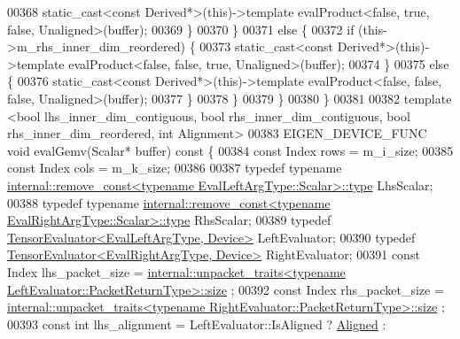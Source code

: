 \begin{DoxyCode}
00368           \textcolor{keyword}{static\_cast<}\textcolor{keyword}{const }Derived*\textcolor{keyword}{>}(\textcolor{keyword}{this})->\textcolor{keyword}{template} evalProduct<false, true, false, Unaligned>(buffer);
00369         \}
00370       \}
00371       \textcolor{keywordflow}{else} \{
00372        \textcolor{keywordflow}{if} (this->m\_rhs\_inner\_dim\_reordered) \{
00373           \textcolor{keyword}{static\_cast<}\textcolor{keyword}{const }Derived*\textcolor{keyword}{>}(\textcolor{keyword}{this})->\textcolor{keyword}{template} evalProduct<false, false, true, Unaligned>(buffer);
00374         \}
00375         \textcolor{keywordflow}{else} \{
00376           \textcolor{keyword}{static\_cast<}\textcolor{keyword}{const }Derived*\textcolor{keyword}{>}(\textcolor{keyword}{this})->\textcolor{keyword}{template} evalProduct<false, false, false, Unaligned>(buffer);
00377         \}
00378       \}
00379     \}
00380   \}
00381 
00382   \textcolor{keyword}{template} <\textcolor{keywordtype}{bool} lhs\_inner\_dim\_contiguous, \textcolor{keywordtype}{bool} rhs\_inner\_dim\_contiguous, \textcolor{keywordtype}{bool} rhs\_inner\_dim\_reordered, \textcolor{keywordtype}{int}
       Alignment>
00383   EIGEN\_DEVICE\_FUNC \textcolor{keywordtype}{void} evalGemv(Scalar* buffer)\textcolor{keyword}{ const }\{
00384     \textcolor{keyword}{const} Index rows = m\_i\_size;
00385     \textcolor{keyword}{const} Index cols = m\_k\_size;
00386 
00387     \textcolor{keyword}{typedef} \textcolor{keyword}{typename} 
      \hyperlink{group___sparse_core___module}{internal::remove\_const<typename EvalLeftArgType::Scalar>::type}
       LhsScalar;
00388     \textcolor{keyword}{typedef} \textcolor{keyword}{typename} 
      \hyperlink{group___sparse_core___module}{internal::remove\_const<typename EvalRightArgType::Scalar>::type}
       RhsScalar;
00389     \textcolor{keyword}{typedef} \hyperlink{struct_eigen_1_1_tensor_evaluator}{TensorEvaluator<EvalLeftArgType, Device>} LeftEvaluator;
00390     \textcolor{keyword}{typedef} \hyperlink{struct_eigen_1_1_tensor_evaluator}{TensorEvaluator<EvalRightArgType, Device>} 
      RightEvaluator;
00391     \textcolor{keyword}{const} Index lhs\_packet\_size = 
      \hyperlink{struct_eigen_1_1internal_1_1unpacket__traits}{internal::unpacket\_traits<typename LeftEvaluator::PacketReturnType>::size}
      ;
00392     \textcolor{keyword}{const} Index rhs\_packet\_size = 
      \hyperlink{struct_eigen_1_1internal_1_1unpacket__traits}{internal::unpacket\_traits<typename RightEvaluator::PacketReturnType>::size}
      ;
00393     \textcolor{keyword}{const} \textcolor{keywordtype}{int} lhs\_alignment = LeftEvaluator::IsAligned ? \hyperlink{group__enums_gga45fe06e29902b7a2773de05ba27b47a1ad37d4c71425bb286e9b4103830538fbf}{Aligned} : 

\end{DoxyCode}
